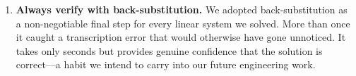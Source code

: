 \documentclass[12pt,a4paper]{article}
\begin{document}
\begin{enumerate}
  \item \textbf{Always verify with back-substitution.}
  We adopted back-substitution as a non-negotiable final step for every linear system we solved.
  More than once it caught a transcription error that would otherwise have gone unnoticed. It takes
  only seconds but provides genuine confidence that the solution is correct---a habit we intend to
  carry into our future engineering work.

\end{enumerate}
\end{document}
